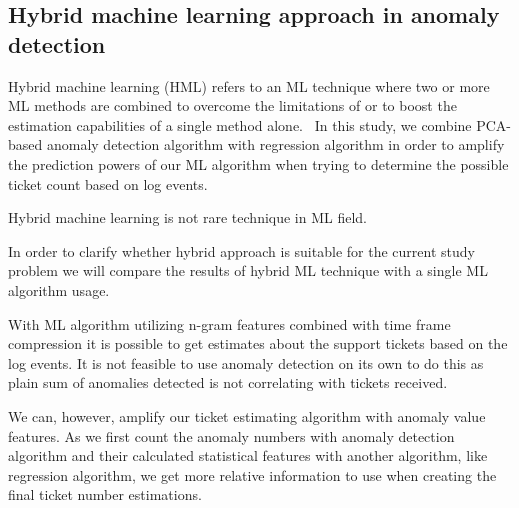 

\subsection{Hybrid machine learning approach in anomaly detection}\label{subsec:bg-hybrid-ml-approach-with-anomaly-detection}

Hybrid machine learning (HML)
refers to an ML technique
where two or more ML methods are combined
to overcome the limitations of
or to boost the estimation capabilities of
a single method alone.~\cite{Anifowose2020hml}
In this study,
we combine PCA-based anomaly detection algorithm
with regression algorithm
in order to amplify the prediction powers of our ML algorithm
when trying to determine the possible ticket count
based on log events.

Hybrid machine learning is not rare technique in ML field.~\cite{shon2007hybrid,tsai2010credit,mohan2019effective,
    hsieh2005hybrid,jain2007hybrid,kim2007hybrid,lee2002credit,malhotra2002differentiating}

In order to clarify whether hybrid approach is suitable for the current study problem
we will compare the results of hybrid ML technique
with a single ML algorithm usage.




With ML algorithm utilizing n-gram features combined with time frame compression
it is possible to get estimates
about the support tickets based on the log events.
It is not feasible to use anomaly detection on its own to do this
as plain sum of anomalies detected
is not correlating with tickets received.

We can, however,
amplify our ticket estimating algorithm with anomaly value features.
As we first count the anomaly numbers with anomaly detection algorithm %
and their calculated statistical features with another algorithm,
like regression algorithm,
we get more relative information to use
when creating the final ticket number estimations. %



